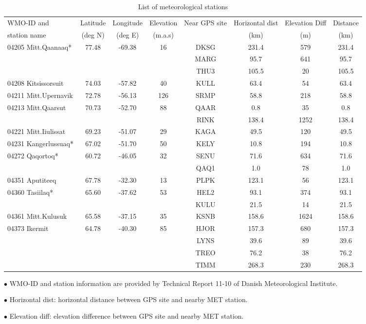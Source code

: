 \clearpage
\begin{table}[h!]
\centering
\caption{List of meteorological stations}
\begin{adjustbox}{width=1\textwidth}
\begin{threeparttable}
\begin{tabular}{lccccccc}
	\midrule
	WMO-ID and & Latitude & Longitude & Elevation & Near GPS site & Horizontal dist & Elevation Diff & Distance \\
	station name & (deg N) & (deg E) & (m.a.s) & & (km) & (m) & (km)\\
	\midrule
	04205 Mitt.Qaanaaq* & 77.48 & -69.38 & 16 & DKSG & 231.4 & 579 & 231.4\\
	&  &  &  & MARG & 95.7 & 641 & 95.7\\
	&  &  &  & THU3 & 105.5 & 20 & 105.5\\
	04208 Kitsissorsuit & 74.03 & -57.82 & 40 & KULL & 63.4 & 54 & 63.4\\
	04211 Mitt.Upernavik & 72.78 & -56.13 & 126 & SRMP & 58.8 & 218 & 58.8\\
	04213 Mitt.Qaarsut & 70.73 & -52.70 & 88 & QAAR & 0.8 & 35 & 0.8\\
	&  &  &  & RINK & 138.4 & 1252 & 138.4\\
	04221 Mitt.Iiulissat & 69.23 & -51.07 & 29 & KAGA & 49.5 & 120 & 49.5\\
	04231 Kangerlussuaq* & 67.02 & -51.70 & 50 & KELY & 10.8 & 194 & 10.8\\
	04272 Qaqortoq* & 60.72 & -46.05 & 32 & SENU & 71.6 & 634 & 71.6\\
	&  &  &  & QAQ1 & 1.0 & 78 & 1.0\\
	04351 Aputiteeq & 67.78 & -32.30 & 13 & PLPK & 123.1 & 56 & 123.1\\
	04360 Tasiilaq* & 65.60 & -37.62 & 53 & HEL2 & 93.1 & 374 & 93.1\\
	&  &  &  & KULU & 21.5 & 14 & 21.5\\
	04361 Mitt.Kulusuk & 65.58 & -37.15 & 35 & KSNB & 158.6 & 1624 & 158.6\\
	04373 Ikermit & 64.78 & -40.30 & 85 & HJOR & 157.3 & 680 & 157.3\\
	&  &  &  & LYNS & 39.6 & 89 & 39.6\\
	&  &  &  & TREO & 76.2 & 38 & 76.2\\
	&  &  &  & TIMM & 268.3 & 230 & 268.3\\
	\midrule
\end{tabular}
\begin{tablenotes}
	\small
	\item $\bullet$ WMO-ID and station information are provided by Technical Report 11-10 of Danish Meteorological Institute.  
	\item $\bullet$ Horizontal dist: horizontal distance between GPS site and nearby MET station. 
	\item $\bullet$ Elevation diff: elevation difference between GPS site and nearby MET station.
\end{tablenotes}
\end{threeparttable}
\end{adjustbox}
\label{tab:SI_chpt3_table2}
\end{table}

